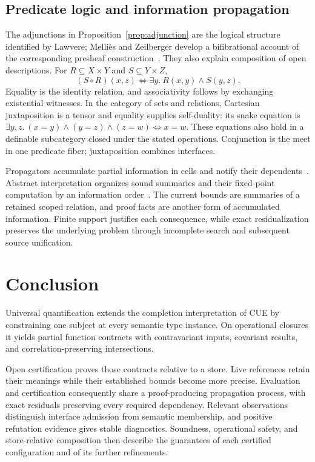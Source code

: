 \documentclass[10pt,a4paper]{article}
\theoremstyle{remark}
\begin{document}
\subsection{Predicate logic and information propagation}
The adjunctions in Proposition~\ref{prop:adjunction} are the logical structure
identified by Lawvere; Melli\`es and Zeilberger develop a bifibrational account
of the corresponding presheaf construction~\cite{lawvere,mellies}. They also
explain composition of open descriptions. For $R\subseteq X\times Y$ and
$S\subseteq Y\times Z$,
\[
 (S\circ R)(x,z)\iff\exists y.\ R(x,y)\land S(y,z).
\]
Equality is the identity relation, and associativity follows by exchanging
existential witnesses. In the category of sets and relations, Cartesian
juxtaposition is a tensor and equality supplies self-duality: its snake equation
is $\exists y,z.\ (x=y)\land(y=z)\land(z=w)\iff x=w$.
These equations also hold in a definable subcategory closed under the stated
operations. Conjunction is the meet in one predicate fiber; juxtaposition
combines interfaces.

Propagators accumulate partial information in cells and notify their
dependents~\cite{propagators}. Abstract interpretation organizes sound summaries
and their fixed-point computation by an information order~\cite{abstract}.
The current bounds are summaries of a retained scoped relation, and proof facts
are another form of accumulated information. Finite support justifies each
consequence, while exact residualization preserves the underlying problem
through incomplete search and subsequent source unification.

\section{Conclusion}
Universal quantification extends the completion interpretation of CUE by
constraining one subject at every semantic type instance. On operational
closures it yields partial function contracts with contravariant inputs,
covariant results, and correlation-preserving intersections.

Open certification proves those contracts relative to a store. Live references
retain their meanings while their established bounds become more precise.
Evaluation and certification consequently share a proof-producing propagation
process, with exact residuals preserving every required dependency. Relevant
observations distinguish interface admission from semantic membership, and
positive refutation evidence gives stable diagnostics. Soundness, operational
safety, and store-relative composition then describe the guarantees of each
certified configuration and of its further refinements.
\end{document}

